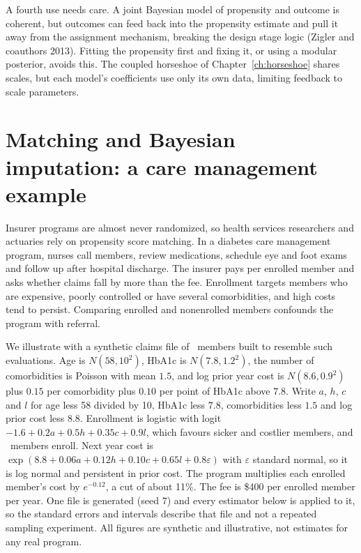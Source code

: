 A fourth use needs care. A joint Bayesian model of propensity and outcome is coherent, but outcomes can feed back into the propensity estimate and pull it away from the assignment mechanism, breaking the design stage logic (Zigler and coauthors 2013). Fitting the propensity first and fixing it, or using a modular posterior, avoids this. The coupled horseshoe of Chapter~\ref{ch:horseshoe} shares scales, but each model's coefficients use only its own data, limiting feedback to scale parameters.

\section{Matching and Bayesian imputation: a care management example}\label{ss:ipw:health}


Insurer programs are almost never randomized, so health services researchers and actuaries rely on propensity score matching. In a diabetes care management program, nurses call members, review medications, schedule eye and foot exams and follow up after hospital discharge. The insurer pays per enrolled member and asks whether claims fall by more than the fee. Enrollment targets members who are expensive, poorly controlled or have several comorbidities, and high costs tend to persist. Comparing enrolled and nonenrolled members confounds the program with referral.

We illustrate with a synthetic claims file of \hcnmem\ members built to resemble such evaluations. Age is $N(58, 10^2)$, HbA1c is $N(7.8, 1.2^2)$, the number of comorbidities is Poisson with mean $1.5$, and log prior year cost is $N(8.6, 0.9^2)$ plus $0.15$ per comorbidity plus $0.10$ per point of HbA1c above $7.8$. Write $a$, $h$, $c$ and $l$ for age less 58 divided by 10, HbA1c less $7.8$, comorbidities less $1.5$ and log prior cost less $8.8$. Enrollment is logistic with logit $-1.6 + 0.2a + 0.5h + 0.35c + 0.9l$, which favours sicker and costlier members, and \hcntreat\ members enroll. Next year cost is $\exp(8.8 + 0.06a + 0.12h + 0.10c + 0.65l + 0.8\varepsilon)$ with $\varepsilon$ standard normal, so it is log normal and persistent in prior cost. The program multiplies each enrolled member's cost by $e^{-0.12}$, a cut of about 11\%. The fee is \$400 per enrolled member per year. One file is generated (seed 7) and every estimator below is applied to it, so the standard errors and intervals describe that file and not a repeated sampling experiment. All figures are synthetic and illustrative, not estimates for any real program.

